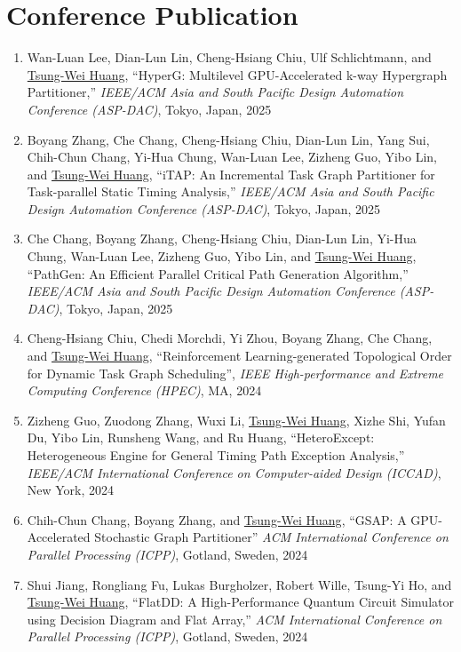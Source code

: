 \documentclass[A4,11pt]{article}
\begin{document}
\section{Conference Publication}
 \begin{enumerate}
 \itemsep-3pt
    \item Wan-Luan Lee, Dian-Lun Lin, Cheng-Hsiang Chiu, Ulf Schlichtmann, and \underline{Tsung-Wei Huang}, ``HyperG: Multilevel GPU-Accelerated k-way Hypergraph Partitioner,'' \textit{IEEE/ACM Asia and South Pacific Design Automation Conference (ASP-DAC)}, Tokyo, Japan, 2025
    \item Boyang Zhang, Che Chang, Cheng-Hsiang Chiu, Dian-Lun Lin, Yang Sui, Chih-Chun Chang, Yi-Hua Chung, Wan-Luan Lee, Zizheng Guo, Yibo Lin, and \underline{Tsung-Wei Huang}, ``iTAP: An Incremental Task Graph Partitioner for Task-parallel Static Timing Analysis,'' \textit{IEEE/ACM Asia and South Pacific Design Automation Conference (ASP-DAC)}, Tokyo, Japan, 2025
    \item Che Chang, Boyang Zhang, Cheng-Hsiang Chiu, Dian-Lun Lin, Yi-Hua Chung, Wan-Luan Lee, Zizheng Guo, Yibo Lin, and \underline{Tsung-Wei Huang}, ``PathGen: An Efficient Parallel Critical Path Generation Algorithm,'' \textit{IEEE/ACM Asia and South Pacific Design Automation Conference (ASP-DAC)}, Tokyo, Japan, 2025
    \item Cheng-Hsiang Chiu, Chedi Morchdi, Yi Zhou, Boyang Zhang, Che Chang, and \underline{Tsung-Wei Huang}, ``Reinforcement Learning-generated Topological Order for Dynamic Task Graph Scheduling'', \textit{IEEE High-performance and Extreme Computing Conference (HPEC)}, MA, 2024
    \item Zizheng Guo, Zuodong Zhang, Wuxi Li, \underline{Tsung-Wei Huang}, Xizhe Shi, Yufan Du, Yibo Lin, Runsheng Wang, and Ru Huang, ``HeteroExcept: Heterogeneous Engine for General Timing Path Exception Analysis,'' \textit{IEEE/ACM International Conference on Computer-aided Design (ICCAD)}, New York, 2024 
    \item Chih-Chun Chang, Boyang Zhang, and \underline{Tsung-Wei Huang}, ``GSAP: A GPU-Accelerated Stochastic Graph Partitioner'' \textit{ACM International Conference on Parallel Processing (ICPP)}, Gotland, Sweden, 2024
    \item Shui Jiang, Rongliang Fu, Lukas Burgholzer, Robert Wille, Tsung-Yi Ho, and \underline{Tsung-Wei Huang}, ``FlatDD: A High-Performance Quantum Circuit Simulator using Decision Diagram and Flat Array,'' \textit{ACM International Conference on Parallel Processing (ICPP)}, Gotland, Sweden, 2024

\end{enumerate}
\end{document}
